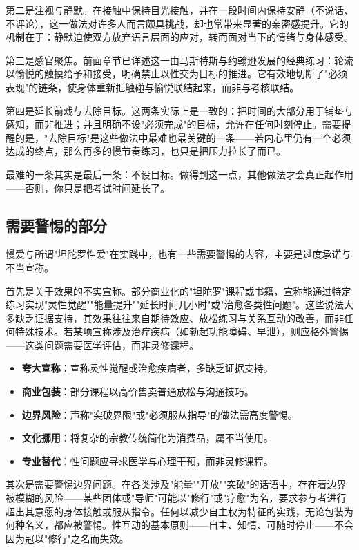 \documentclass[12pt,UTF8]{ctexbook}
\newcommand{\keyword}[1]{\textbf{#1}}
\begin{document}
第二是注视与静默。在接触中保持目光接触，并在一段时间内保持安静（不说话、不评论），这一做法对许多人而言颇具挑战，却也常带来显著的亲密感提升。它的机制在于：静默迫使双方放弃语言层面的应对，转而面对当下的情绪与身体感受。

第三是感官聚焦。前面章节已详述这一由马斯特斯与约翰逊发展的经典练习：轮流以愉悦的触摸给予和接受，明确禁止以性交为目标的推进。它有效地切断了"必须表现"的链条，使身体重新把触碰与愉悦联结起来，而非与考核联结。

第四是延长前戏与去除目标。这两条实际上是一致的：把时间的大部分用于铺垫与感知，而非推进；并且明确不设"必须完成"的目标，允许在任何时刻停止。需要提醒的是，"去除目标"是这些做法中最难也最关键的一条——若内心里仍有一个必须达成的终点，那么再多的慢节奏练习，也只是把压力拉长了而已。

\begin{tcolorbox}[colback=pink!5!white,colframe=red!50!black,title=贴心小叮咛]
	最难的一条其实是最后一条：不设目标。做得到这一点，其他做法才会真正起作用——否则，你只是把考试时间延长了。
\end{tcolorbox}
\subsection{需要警惕的部分}

慢爱与所谓"坦陀罗性爱"在实践中，也有一些需要警惕的内容，主要是过度承诺与不当宣称。

首先是关于效果的不实宣称。部分商业化的"坦陀罗"课程或书籍，宣称能通过特定练习实现"灵性觉醒""能量提升""延长时间几小时"或"治愈各类性问题"。这些说法大多缺乏证据支持，其效果往往来自期待效应、放松练习与关系互动的改善，而非任何特殊技术。若某项宣称涉及治疗疾病（如勃起功能障碍、早泄），则应格外警惕——这类问题需要医学评估，而非灵修课程。

\begin{itemize}
	\item \keyword{夸大宣称}：宣称灵性觉醒或治愈疾病者，多缺乏证据支持。
	\item \keyword{商业包装}：部分课程以高价售卖普通放松与沟通技巧。
	\item \keyword{边界风险}：声称"突破界限"或"必须服从指导"的做法需高度警惕。
	\item \keyword{文化挪用}：将复杂的宗教传统简化为消费品，属不当使用。
	\item \keyword{专业替代}：性问题应寻求医学与心理干预，而非灵修课程。
\end{itemize}

其次是需要警惕边界问题。在各类涉及"能量""开放""突破"的话语中，存在着边界被模糊的风险——某些团体或"导师"可能以"修行"或"疗愈"为名，要求参与者进行超出其意愿的身体接触或服从指令。任何以减少自主权为特征的实践，无论包装为何种名义，都应被警惕。性互动的基本原则——自主、知情、可随时停止——不会因为冠以"修行"之名而失效。
\end{document}
